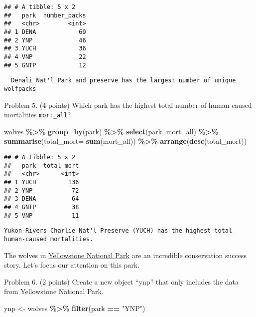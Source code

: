 \documentclass[
]{article}
\newenvironment{Shaded}{\begin{snugshade}}{\end{snugshade}}
\newcommand{\AttributeTok}[1]{\textcolor[rgb]{0.13,0.29,0.53}{#1}}
\newcommand{\FunctionTok}[1]{\textcolor[rgb]{0.13,0.29,0.53}{\textbf{#1}}}
\newcommand{\NormalTok}[1]{#1}
\newcommand{\OtherTok}[1]{\textcolor[rgb]{0.56,0.35,0.01}{#1}}
\newcommand{\SpecialCharTok}[1]{\textcolor[rgb]{0.81,0.36,0.00}{\textbf{#1}}}
\newcommand{\StringTok}[1]{\textcolor[rgb]{0.31,0.60,0.02}{#1}}
\begin{document}
\begin{verbatim}
## # A tibble: 5 x 2
##   park  number_packs
##   <chr>        <int>
## 1 DENA            69
## 2 YNP             46
## 3 YUCH            36
## 4 VNP             22
## 5 GNTP            12
\end{verbatim}

\begin{verbatim}
  Denali Nat'l Park and preserve has the largest number of unique wolfpacks 
\end{verbatim}

Problem 5. (4 points) Which park has the highest total number of
human-caused mortalities \texttt{mort\_all}?

\begin{Shaded}
\begin{Highlighting}[]
\NormalTok{wolves }\SpecialCharTok{\%\textgreater{}\%}
  \FunctionTok{group\_by}\NormalTok{(park) }\SpecialCharTok{\%\textgreater{}\%}
  \FunctionTok{select}\NormalTok{(park, mort\_all) }\SpecialCharTok{\%\textgreater{}\%}
  \FunctionTok{summarise}\NormalTok{(}\AttributeTok{total\_mort=} \FunctionTok{sum}\NormalTok{(mort\_all)) }\SpecialCharTok{\%\textgreater{}\%}
  \FunctionTok{arrange}\NormalTok{(}\FunctionTok{desc}\NormalTok{(total\_mort))}
\end{Highlighting}
\end{Shaded}

\begin{verbatim}
## # A tibble: 5 x 2
##   park  total_mort
##   <chr>      <int>
## 1 YUCH         136
## 2 YNP           72
## 3 DENA          64
## 4 GNTP          38
## 5 VNP           11
\end{verbatim}

\begin{verbatim}
Yukon-Rivers Charlie Nat'l Preserve (YUCH) has the highest total human-caused mortalities.
\end{verbatim}

The wolves in
\href{https://www.nps.gov/yell/learn/nature/wolf-restoration.htm}{Yellowstone
National Park} are an incredible conservation success story. Let's focus
our attention on this park.

Problem 6. (2 points) Create a new object ``ynp'' that only includes the
data from Yellowstone National Park.

\begin{Shaded}
\begin{Highlighting}[]
\NormalTok{ynp }\OtherTok{\textless{}{-}}\NormalTok{ wolves }\SpecialCharTok{\%\textgreater{}\%}
  \FunctionTok{filter}\NormalTok{(park }\SpecialCharTok{==} \StringTok{"YNP"}\NormalTok{)}
\end{Highlighting}
\end{Shaded}
\end{document}
